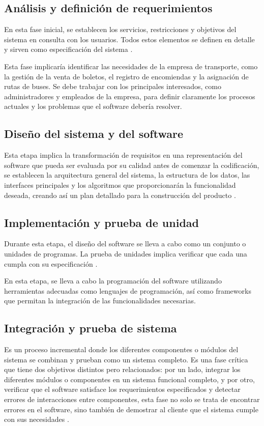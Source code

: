 		
	\subsection{Análisis y definición de requerimientos}
		En esta fase inicial, se establecen los servicios, restricciones y objetivos del sistema en consulta con los usuarios. Todos estos elementos se definen en detalle y sirven como especificación del sistema \parencite{sommerville2011introduccion}.
		
		Esta fase implicaría identificar las necesidades de la empresa de transporte, como la gestión de la venta de boletos, el registro de encomiendas y la asignación de rutas de buses. Se debe trabajar con los principales interesados, como administradores y empleados de la empresa, para definir claramente los procesos actuales y los problemas que el software debería resolver.
	\subsection{Diseño del sistema y del software}
	\label{subsec:Dis_sis_softwa} %
		Esta etapa implica la transformación de requisitos en una representación del software que pueda ser evaluada por su calidad antes de comenzar la codificación, se establecen la arquitectura general del sistema, la estructura de los datos, las interfaces principales y los algoritmos que proporcionarán la funcionalidad deseada, creando así un plan detallado para la construcción del producto \parencite{pressman2010ingenieria}.
		
	\subsection{Implementación y prueba de unidad}
		Durante esta etapa, el diseño del software se lleva a cabo como un conjunto o unidades de programas. La prueba de unidades implica verificar que cada una cumpla con su especificación \parencite{sommerville2011introduccion}.
		
		En esta etapa, se lleva a cabo la programación del software utilizando herramientas adecuadas como lenguajes de programación, así como frameworks que permitan la integración de las funcionalidades necesarias.
	\subsection{Integración y prueba de sistema}
		Es un proceso incremental donde los diferentes componentes o módulos del sistema se combinan y prueban como un sistema completo. Es una fase crítica que tiene dos objetivos distintos pero relacionados: por un lado, integrar los diferentes módulos o componentes en un sistema funcional completo, y por otro, verificar que el software satisface los requerimientos especificados y detectar errores de interacciones entre componentes, esta fase no solo se trata de encontrar errores en el software, sino también de demostrar al cliente que el sistema cumple con sus necesidades \parencite{sommerville2011introduccion}.
		
